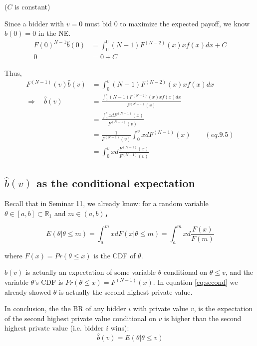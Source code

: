 \documentclass{article}
\newcommand{\R}{\mathbb{R}}
\begin{document}
\begin{mdframed}[backgroundcolor=blue!20,linecolor=white]
($C$ is constant)

\medskip

Since a bidder with $v=0$ must bid $0$ to maximize the expected payoff, we know $\hat{b}(0)=0$ in the NE.
\begin{align*}
F(0)^{N-1}\hat{b}(0)&= \int_0^{0} (N-1)F^{(N-2)}(x)xf(x)dx + C \\
0&= 0+ C
\end{align*}

Thus,
\begin{align*}
F^{(N-1)}(v)\hat{b}(v)&= \int_0^{v} (N-1)F^{(N-2)}(x)xf(x)dx \\
\Rightarrow \quad \hat{b}(v)&= \frac{\int_0^{v} (N-1)F^{(N-2)}(x)xf(x)dx}{F^{(N-1)}(v)} \\
&= \frac{\int_0^{v} xdF^{(N-1)}(x)}{F^{(N-1)}(v)} \\
&= \frac{1}{F^{(N-1)}(v)} \int_0^{v}x d F^{(N-1)}(x) \quad \quad (eq.9.5)  \\
&= \int_0^{v}xd\frac{F^{(N-1)}(x)}{F^{(N-1)}(v)}
\end{align*}

\subsection*{$\hat{b}(v)$ as the conditional expectation}

Recall that in Seminar 11, we already know: for a random variable $\theta \in [a,b] \subset \R_1$ and $m \in (a,b)$，

$$E(\theta|\theta \le m) = \int^m_a x d F(x|\theta \le m)=\int^m_a x d \frac{F(x)}{F(m)}$$

where $F(x) = Pr(\theta\le x)$ is the CDF of $\theta$.

\medskip

$\hat{b}(v)$ is actually an expectation of some variable $\theta$ conditional on $\theta \le v$, and the variable $\theta$'s CDF is $Pr(\theta \le x) = F^{(N-1)}(x)$. In equation \ref{eq:second} we already showed $\theta$ is actually the second highest private value.

\medskip

In conclusion, the the BR of any bidder $i$ with private value $v$, is the expectation of the second highest private value conditional on $v$ is higher than the second highest private value (i.e. bidder $i$ wins):
\begin{equation}
\hat{b}(v) = E(\theta|\theta \le v)
    \label{eq:b}   
\end{equation}

\end{mdframed}
\end{document}
